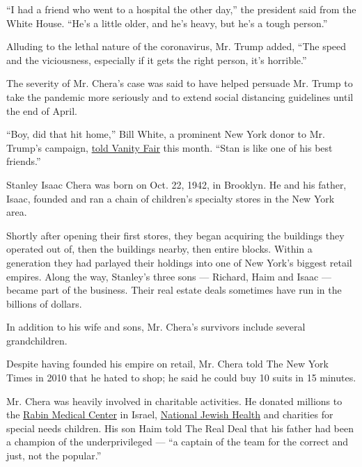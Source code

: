 ``I had a friend who went to a hospital the other day,'' the president
said from the White House. ``He's a little older, and he's heavy, but
he's a tough person.''

Alluding to the lethal nature of the coronavirus, Mr. Trump added, ``The
speed and the viciousness, especially if it gets the right person, it's
horrible.''

The severity of Mr. Chera's case was said to have helped persuade Mr.
Trump to take the pandemic more seriously and to extend social
distancing guidelines until the end of April.

``Boy, did that hit home,'' Bill White, a prominent New York donor to
Mr. Trump's campaign,
\href{https://www.vanityfair.com/news/2020/04/inside-trumps-decision-to-back-off-of-his-easter-coronavirus-miracle}{told
Vanity Fair} this month. ``Stan is like one of his best friends.''

Stanley Isaac Chera was born on Oct. 22, 1942, in Brooklyn. He and his
father, Isaac, founded and ran a chain of children's specialty stores in
the New York area.

Shortly after opening their first stores, they began acquiring the
buildings they operated out of, then the buildings nearby, then entire
blocks. Within a generation they had parlayed their holdings into one of
New York's biggest retail empires. Along the way, Stanley's three sons
--- Richard, Haim and Isaac --- became part of the business. Their real
estate deals sometimes have run in the billions of dollars.

In addition to his wife and sons, Mr. Chera's survivors include several
grandchildren.

Despite having founded his empire on retail, Mr. Chera told The New York
Times in 2010 that he hated to shop; he said he could buy 10 suits in 15
minutes.

Mr. Chera was heavily involved in charitable activities. He donated
millions to the
\href{https://hospitals.clalit.co.il/rabin/en/Pages/default.aspx}{Rabin
Medical Center} in Israel,
\href{https://www.nationaljewish.org/home}{National Jewish Health} and
charities for special needs children. His son Haim told The Real Deal
that his father had been a champion of the underprivileged --- ``a
captain of the team for the correct and just, not the popular.''

\href{https://www.nytimes3xbfgragh.onion/interactive/2020/obituaries/people-died-coronavirus-obituaries.html?action=click\&pgtype=Article\&state=default\&region=BELOW_MAIN_CONTENT\&context=covid_obits_promo}{}

